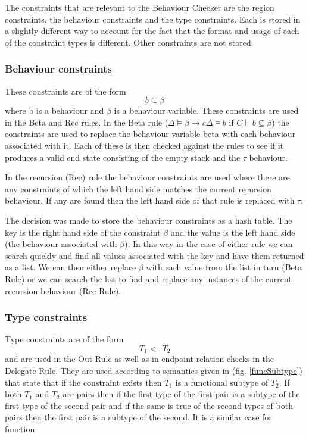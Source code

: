 The constraints that are relevant to the Behaviour Checker are the region constraints, the behaviour constraints and the type constraints. Each is stored in a slightly different way to account for the fact that the format and usage of each of the constraint types is different. Other constraints are not stored. 

\subsubsection{Behaviour constraints}

These constraints are of the form $$b \subseteq \beta$$ where b is a behaviour and $\beta$ is a behaviour variable. These constraints are used in the Beta and Rec rules. In the Beta rule ($\Delta \models \beta \rightarrow c \Delta \models b$ if $C \vdash b \subseteq \beta$) the constraints are used to replace the behaviour variable beta with each behaviour associated with it. Each of these is then checked against the rules to see if it produces a valid end state consisting of the empty stack and the $\tau$ behaviour.  

In the recursion (Rec) rule the behaviour constraints are used where there are any constraints of which the left hand side matches the current recursion behaviour. If any are found then the left hand side of that rule is replaced with $\tau$. 

The decision was made to store the behaviour constraints as a hash table. The key is the right hand side of the constraint $\beta$ and the value is the left hand side (the behaviour associated with $\beta$). In this way in the case of either rule we can search quickly and find all values associated with the key and have them returned as a list. We can then either replace $\beta$ with each value from the list in turn (Beta Rule) or we can search the list to find and replace any instances of the current recursion behaviour (Rec Rule). 

\subsubsection{Type constraints}

Type constraints are of the form $$T_1 <: T_2$$ and are used in the Out Rule as well as in endpoint relation checks in the Delegate Rule. They are used according to semantics given in (fig. \ref{funcSubtype}) that state that if the constraint exists then $T_1$ is a functional subtype of $T_2$. If both $T_1$ and $T_2$ are pairs then if the first type of the first pair is a subtype of the first type of the second pair and if the same is true of the second types of both pairs then the first pair is a subtype of the second. It is a similar case for function. 

